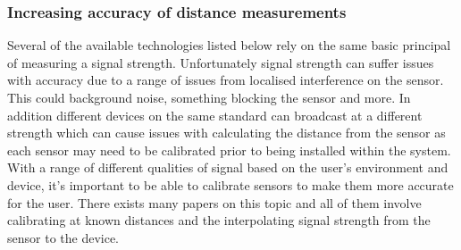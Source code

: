 \subsubsection{Increasing accuracy of distance measurements}
Several of the available technologies listed below rely on the same basic principal of measuring a signal strength. Unfortunately signal strength can suffer issues with accuracy due to a range of issues from localised interference on the sensor. This could background noise, something blocking the sensor and more. In addition different devices on the same standard can broadcast at a different strength which can cause issues with calculating the distance from the sensor as each sensor may need to be calibrated prior to being installed within the system. With a range of different qualities of signal based on the user’s environment and device, it’s important to be able to calibrate sensors to make them more accurate for the user. There exists many papers on this topic and all of them involve calibrating at known distances and the interpolating signal strength from the sensor to the device. 